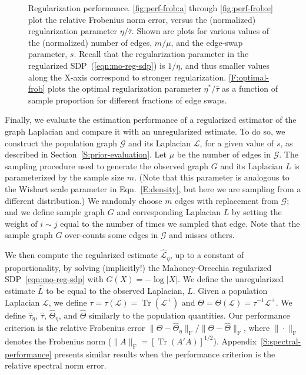 \documentclass[12pt]{article}
\DeclareMathOperator*{\Tr}{Tr}
\theoremstyle{plain}
\begin{document}
\begin{figure}[h]
{  }
\vspace{-1em}
\caption{Regularization performance.
\ref{fig:perf-frob:a} through \ref{fig:perf-frob:e} plot the relative 
Frobenius norm error, versus the (normalized) regularization parameter 
$\eta / \bar \tau$.
Shown are plots for various values of the (normalized) number of edges, 
$m/\mu$, and the edge-swap parameter, $s$.
Recall that the regularization parameter in the regularized 
SDP~(\ref{eqn:mo-reg-sdp}) is $1/\eta$, and thus smaller values along the 
X-axis correspond to stronger regularization.
\ref{F:optimal-frob} plots the optimal regularization parameter 
$\eta^\ast / \bar \tau$ as a function of sample proportion for different
fractions of edge swaps.  }
\label{fig:perf-frob}
\end{figure}


Finally, we evaluate the estimation performance of a regularized estimator 
of the graph Laplacian and compare it with an unregularized estimate.  
To do so, we construct the population graph $\mathcal{G}$ and its Laplacian 
$\mathcal{L}$, for a given value of $s$, as described in 
Section~\ref{S:prior-evaluation}.  
Let $\mu$ be the number of edges in $\mathcal{G}$. 
The sampling procedure used to generate the observed graph $G$ and its 
Laplacian $L$ is parameterized by the sample size $m$.
(Note that this parameter is analogous to the Wishart scale parameter in
Eqn.~\eqref{E:density}, but here we are sampling from a different 
distribution.)
We randomly choose $m$ edges with replacement from $\mathcal{G}$; and we 
define sample graph $G$ and corresponding Laplacian $L$ by setting the weight 
of $i \sim j$ equal to the number of times we sampled that edge.  
Note that the sample graph $G$ over-counts some edges in $\mathcal{G}$ and 
misses others.

We then compute the regularized estimate $\mathcal{\hat L}_\eta$, up to a 
constant of proportionality, by solving (implicitly!) the Mahoney-Orecchia
regularized SDP~\eqref{eqn:mo-reg-sdp} with $G(X) = -\log|X|$.  
We define the unregularized estimate $\hat L$ to be equal to the observed 
Laplacian, $L$.  
Given a population Laplacian $\mathcal{L}$, we define
$\tau = \tau(\mathcal{L}) = \Tr(\mathcal{L}^+)$ and
$\Theta = \Theta(\mathcal{L}) = \tau^{-1} \mathcal{L}^+$. 
We define $\hat \tau_\eta$, $\hat \tau$, $\hat \Theta_\eta$, and 
$\hat \Theta$ similarly to the population quantities.  
Our performance criterion is the relative Frobenius error
$\|\Theta - \hat \Theta_\eta\|_\mathrm{F} / \|\Theta - \hat \Theta
\|_\mathrm{F}$, where $\|\cdot\|_\mathrm{F}$ denotes the Frobenius norm
($\|A\|_\mathrm{F} = [\Tr(A' A)]^{1/2}$).  
Appendix~\ref{S:spectral-performance} presents similar results when the
performance criterion is the relative spectral norm error.
\end{document}
